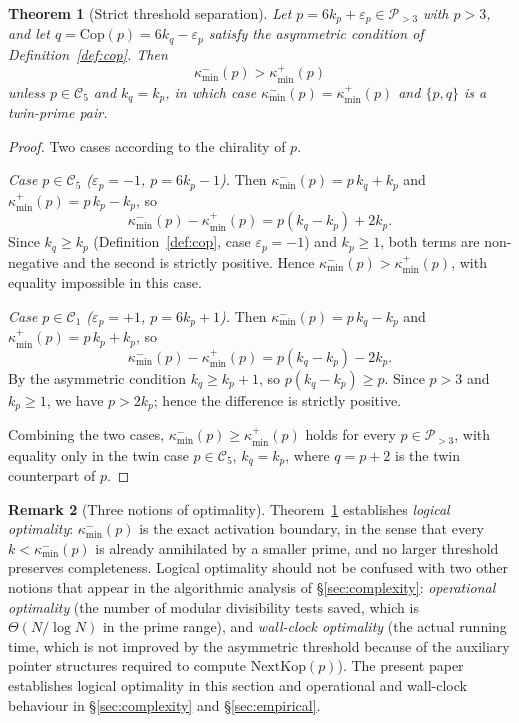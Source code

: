\documentclass[11pt]{amsart}
\numberwithin{equation}{section}
\newcommand{\cP}{\mathcal{P}}
\newcommand{\kminp}{\kappa_{\min}^{+}}
\newcommand{\kminm}{\kappa_{\min}^{-}}
\newcommand{\Cone}{\mathcal{C}_1}
\newcommand{\Cfive}{\mathcal{C}_5}
\newcommand{\NextKop}{\mathrm{NextKop}}
\newcommand{\Cop}{\mathrm{Cop}}
\theoremstyle{plain}
\newtheorem{theorem}{Theorem}[section]
\theoremstyle{definition}
\newtheorem{remark}[theorem]{Remark}
\begin{document}
\begin{theorem}[Strict threshold separation]
\label{thm:threshold-separation}
Let $p=6k_p+\varepsilon_p\in\cP_{>3}$ with $p>3$, and let
$q=\Cop(p)=6k_q-\varepsilon_p$ satisfy the asymmetric condition of
Definition~\ref{def:cop}. Then
\begin{equation}
\kminm(p)>\kminp(p)
\end{equation}
unless $p\in\Cfive$ and $k_q=k_p$, in which case $\kminm(p)=\kminp(p)$
and $\{p,q\}$ is a twin-prime pair.
\end{theorem}

\begin{proof}
Two cases according to the chirality of $p$.

\emph{Case $p\in\Cfive$ ($\varepsilon_p=-1$, $p=6k_p-1$).}
Then $\kminm(p)=p\,k_q+k_p$ and $\kminp(p)=p\,k_p-k_p$, so
\begin{equation*}
\kminm(p)-\kminp(p)=p(k_q-k_p)+2k_p.
\end{equation*}
Since $k_q\ge k_p$ (Definition~\ref{def:cop}, case $\varepsilon_p=-1$)
and $k_p\ge 1$, both terms are non-negative and the second is strictly
positive. Hence $\kminm(p)>\kminp(p)$, with equality impossible in
this case.

\emph{Case $p\in\Cone$ ($\varepsilon_p=+1$, $p=6k_p+1$).}
Then $\kminm(p)=p\,k_q-k_p$ and $\kminp(p)=p\,k_p+k_p$, so
\begin{equation*}
\kminm(p)-\kminp(p)=p(k_q-k_p)-2k_p.
\end{equation*}
By the asymmetric condition $k_q\ge k_p+1$, so $p(k_q-k_p)\ge p$. Since
$p>3$ and $k_p\ge 1$, we have $p>2k_p$; hence the difference is
strictly positive.

Combining the two cases, $\kminm(p)\ge\kminp(p)$ holds for every
$p\in\cP_{>3}$, with equality only in the twin case $p\in\Cfive$,
$k_q=k_p$, where $q=p+2$ is the twin counterpart of $p$.
\end{proof}

\begin{remark}[Three notions of optimality]
\label{rem:three-optimalities}
Theorem~\ref{thm:threshold-separation} establishes \emph{logical
optimality}: $\kminm(p)$ is the exact activation boundary, in the
sense that every $k<\kminm(p)$ is already annihilated by a smaller
prime, and no larger threshold preserves completeness. Logical
optimality should not be confused with two other notions that appear
in the algorithmic analysis of \S\ref{sec:complexity}: \emph{operational
optimality} (the number of modular divisibility tests saved, which is
$\Theta(N/\log N)$ in the prime range), and \emph{wall-clock
optimality} (the actual running time, which is not improved by the
asymmetric threshold because of the auxiliary pointer structures
required to compute $\NextKop(p)$). The present paper establishes
logical optimality in this section and operational and wall-clock
behaviour in \S\ref{sec:complexity} and \S\ref{sec:empirical}.
\end{remark}
\end{document}
